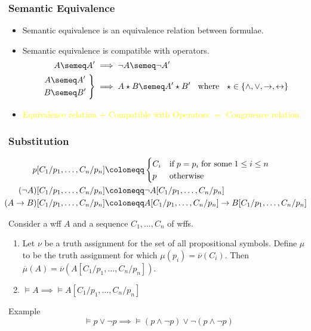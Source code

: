\documentclass[UTF8,11pt,colorlinks,compress,openany]{beamer}%
\begin{document}
\begin{frame}\frametitle{Semantic Equivalence}
	\begin{itemize}
		\item Semantic equivalence is an equivalence relation between formulae.
		\item Semantic equivalence is compatible with operators.
\begin{align*}
A\semeq A'&\implies\neg A\semeq\neg A'\\
\left.
	\begin{aligned}
		A&\semeq A'\\
		B&\semeq B'
	\end{aligned}\;\right\}&\implies A\star B \semeq A'\star B' \;\;\mbox{ where }\;\; \star\in\{\wedge,\vee,\to,\leftrightarrow\}
\end{align*}
		\item \textcolor{yellow}{\small Equivalence relation $+$ Compatible with Operators $=$ Congruence relation}
	\end{itemize}
\end{frame}

\begin{frame}\frametitle{Substitution}\vspace*{-3ex}
	\begin{align*}
	p[C_1/p_1,\dots,C_n/p_n]&\coloneqq 
	\begin{cases}
	 C_i &\text{if}\;p=p_i\;\text{for some}\;1\leq i\leq n\\
	p &\text{otherwise}
	\end{cases}\\
	(\neg A)[C_1/p_1,\dots,C_n/p_n]&\coloneqq \neg A[C_1/p_1,\dots,C_n/p_n]\\
	\hspace*{-7pt}(A\to B)[C_1/p_1,\dots,C_n/p_n]&\coloneqq A[C_1/p_1,\dots,C_n/p_n]\to B[C_1/p_1,\dots,C_n/p_n]
	\end{align*}
	\begin{theorem}
		Consider a wff $A$ and a sequence $C_1,\dots,C_n$ of wffs.
		\begin{enumerate}
			\item Let $\nu$ be a truth assignment for the set of all propositional symbols. Define $\mu$ to be the truth assignment for which $\mu(p_i)=\overline{\nu}(C_i)$. Then $\overline{\mu}(A)=\overline{\nu}\left(A[C_1/p_1,\dots,C_n/p_n]\right)$.
			\item $\vDash A\implies\vDash A[C_1/p_1,\dots,C_n/p_n]$
		\end{enumerate}
	\end{theorem}
	\begin{block}{Example}
		\[\vDash p\vee\neg p\implies\vDash(p\wedge\neg p)\vee\neg(p\wedge\neg p)\]
	\end{block}
\end{frame}
\end{document}
